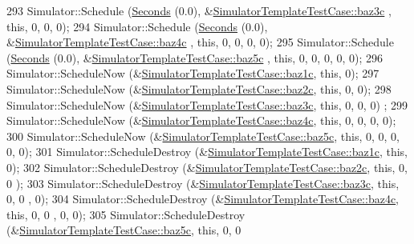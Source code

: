 \begin{DoxyCode}
293   Simulator::Schedule (\hyperlink{group__timecivil_ga33c34b816f8ff6628e33d5c8e9713b9e}{Seconds} (0.0), &\hyperlink{classSimulatorTemplateTestCase_ab2f083ff848a8cffdb78e59bf9c5501c}{SimulatorTemplateTestCase::baz3c}
      , \textcolor{keyword}{this}, 0, 0, 0);
294   Simulator::Schedule (\hyperlink{group__timecivil_ga33c34b816f8ff6628e33d5c8e9713b9e}{Seconds} (0.0), &\hyperlink{classSimulatorTemplateTestCase_a71dcdfaf38733e4f3b6ae1d8e9c910fb}{SimulatorTemplateTestCase::baz4c}
      , \textcolor{keyword}{this}, 0, 0, 0, 0);
295   Simulator::Schedule (\hyperlink{group__timecivil_ga33c34b816f8ff6628e33d5c8e9713b9e}{Seconds} (0.0), &\hyperlink{classSimulatorTemplateTestCase_a85db33b24c84a2e6c623e1bdac2b5b11}{SimulatorTemplateTestCase::baz5c}
      , \textcolor{keyword}{this}, 0, 0, 0, 0, 0);
296   Simulator::ScheduleNow (&\hyperlink{classSimulatorTemplateTestCase_af05903f120083bb45844f0a27234441f}{SimulatorTemplateTestCase::baz1c}, \textcolor{keyword}{this}, 0);
297   Simulator::ScheduleNow (&\hyperlink{classSimulatorTemplateTestCase_a6bec79b87dd5ccbd94c5e3af6b2462ea}{SimulatorTemplateTestCase::baz2c}, \textcolor{keyword}{this}, 0, 0);
298   Simulator::ScheduleNow (&\hyperlink{classSimulatorTemplateTestCase_ab2f083ff848a8cffdb78e59bf9c5501c}{SimulatorTemplateTestCase::baz3c}, \textcolor{keyword}{this}, 0, 0, 0)
      ;
299   Simulator::ScheduleNow (&\hyperlink{classSimulatorTemplateTestCase_a71dcdfaf38733e4f3b6ae1d8e9c910fb}{SimulatorTemplateTestCase::baz4c}, \textcolor{keyword}{this}, 0, 0, 0,
       0);
300   Simulator::ScheduleNow (&\hyperlink{classSimulatorTemplateTestCase_a85db33b24c84a2e6c623e1bdac2b5b11}{SimulatorTemplateTestCase::baz5c}, \textcolor{keyword}{this}, 0, 0, 0,
       0, 0);
301   Simulator::ScheduleDestroy (&\hyperlink{classSimulatorTemplateTestCase_af05903f120083bb45844f0a27234441f}{SimulatorTemplateTestCase::baz1c}, \textcolor{keyword}{this}, 0);
302   Simulator::ScheduleDestroy (&\hyperlink{classSimulatorTemplateTestCase_a6bec79b87dd5ccbd94c5e3af6b2462ea}{SimulatorTemplateTestCase::baz2c}, \textcolor{keyword}{this}, 0, 0
      );
303   Simulator::ScheduleDestroy (&\hyperlink{classSimulatorTemplateTestCase_ab2f083ff848a8cffdb78e59bf9c5501c}{SimulatorTemplateTestCase::baz3c}, \textcolor{keyword}{this}, 0, 0
      , 0);
304   Simulator::ScheduleDestroy (&\hyperlink{classSimulatorTemplateTestCase_a71dcdfaf38733e4f3b6ae1d8e9c910fb}{SimulatorTemplateTestCase::baz4c}, \textcolor{keyword}{this}, 0, 0
      , 0, 0);
305   Simulator::ScheduleDestroy (&\hyperlink{classSimulatorTemplateTestCase_a85db33b24c84a2e6c623e1bdac2b5b11}{SimulatorTemplateTestCase::baz5c}, \textcolor{keyword}{this}, 0, 0

\end{DoxyCode}
